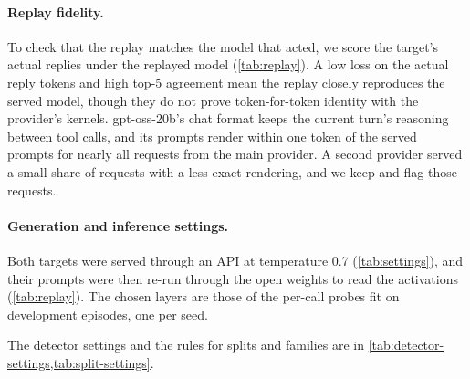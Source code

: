 \paragraph{Replay fidelity.}
To check that the replay matches the model that acted, we score the target's actual replies under the replayed model (\cref{tab:replay}).
A low loss on the actual reply tokens and high top-5 agreement mean the replay closely reproduces the served model, though they do not prove token-for-token identity with the provider's kernels.
gpt-oss-20b's chat format keeps the current turn's reasoning between tool calls, and its prompts render within one token of the served prompts for nearly all requests from the main provider.
A second provider served a small share of requests with a less exact rendering, and we keep and flag those requests.

\begin{table}[h]
  \centering
  \small
  
  \caption{Replay fidelity: loss of the actual reply tokens under the replayed model, and top-5 token agreement.}
  \label{tab:replay}
\end{table}

\paragraph{Generation and inference settings.}
Both targets were served through an API at temperature 0.7 (\cref{tab:settings}), and their prompts were then re-run through the open weights to read the activations (\cref{tab:replay}).
The chosen layers are those of the per-call probes fit on development episodes, one per seed.

\begin{table}[h]
  \centering
  \small
  
  \caption{Generation and inference settings.}
  \label{tab:settings}
\end{table}

The detector settings and the rules for splits and families are in \cref{tab:detector-settings,tab:split-settings}.

\begin{table}[h]
  \centering
  \small
  
  \caption{Settings of the trained text classifier, the neural-network probe and the incoming-only probe.}
  \label{tab:detector-settings}
\end{table}

\begin{table}[h]
  \centering
  \small
  
  \caption{How families of related episodes and the inner validation splits are defined.}
  \label{tab:split-settings}
\end{table}


